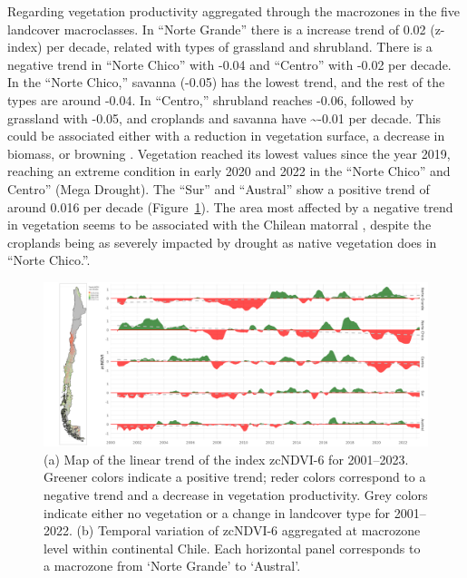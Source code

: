 \documentclass[
  authoryear,
  preprint,
  3p,
  onecolumn]{elsarticle}
\begin{document}
Regarding vegetation productivity aggregated through the macrozones in
the five landcover macroclasses. In ``Norte Grande'' there is a increase
trend of 0.02 (z-index) per decade, related with types of grassland and
shrubland. There is a negative trend in ``Norte Chico'' with -0.04 and
``Centro'' with -0.02 per decade. In the ``Norte Chico,'' savanna
(-0.05) has the lowest trend, and the rest of the types are around
-0.04. In ``Centro,'' shrubland reaches -0.06, followed by grassland
with -0.05, and croplands and savanna have \textasciitilde-0.01 per
decade. This could be associated either with a reduction in vegetation
surface, a decrease in biomass, or browning \citep{Miranda2023}.
Vegetation reached its lowest values since the year 2019, reaching an
extreme condition in early 2020 and 2022 in the ``Norte Chico'' and
Centro'' (Mega Drought). The ``Sur'' and ``Austral'' show a positive
trend of around 0.016 per decade (Figure~\ref{fig-zcNDVI_var}). The area
most affected by a negative trend in vegetation seems to be associated
with the Chilean matorral \citep{Fuentes2021}, despite the croplands
being as severely impacted by drought as native vegetation does in
``Norte Chico.''.

\begin{figure}[!ht]

{\centering \includegraphics{../output/figs/temporal_variation_zcNDVI6_macrozonas_con_mapa.png}

}

\caption{\label{fig-zcNDVI_var}(a) Map of the linear trend of the index
zcNDVI-6 for 2001--2023. Greener colors indicate a positive trend; reder
colors correspond to a negative trend and a decrease in vegetation
productivity. Grey colors indicate either no vegetation or a change in
landcover type for 2001--2022. (b) Temporal variation of zcNDVI-6
aggregated at macrozone level within continental Chile. Each horizontal
panel corresponds to a macrozone from `Norte Grande' to `Austral'.}

\end{figure}
\end{document}
